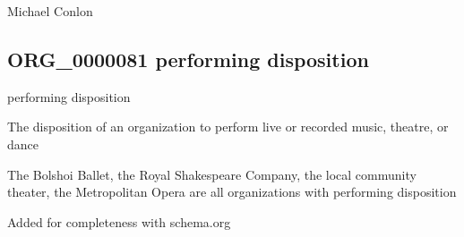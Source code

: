 \documentclass[letterpaper,10pt,english]{sphinxmanual}
\begin{document}
\begin{sphinxShadowBox}

\sphinxAtStartPar
Michael Conlon 
\end{sphinxShadowBox}
\begin{quote}

\ignorespaces \end{quote}


\subsection{ORG\_0000081 \sphinxhyphen{} performing disposition}
\label{\detokenize{doc-ORG_0000081:org-0000081-performing-disposition}}\label{\detokenize{doc-ORG_0000081:index-0}}\label{\detokenize{doc-ORG_0000081::doc}}
\begin{sphinxShadowBox}

\sphinxAtStartPar
performing disposition
\end{sphinxShadowBox}

\begin{sphinxShadowBox}

\sphinxAtStartPar
The disposition of an organization to perform live or recorded music, theatre, or dance
\end{sphinxShadowBox}

\begin{sphinxShadowBox}

\sphinxAtStartPar
{}
\end{sphinxShadowBox}

\begin{sphinxShadowBox}

\sphinxAtStartPar
The Bolshoi Ballet, the Royal Shakespeare Company, the local community theater, the Metropolitan Opera are all organizations with performing disposition
\end{sphinxShadowBox}

\begin{sphinxShadowBox}

\sphinxAtStartPar
Added for completeness with schema.org
\end{sphinxShadowBox}
\end{document}
